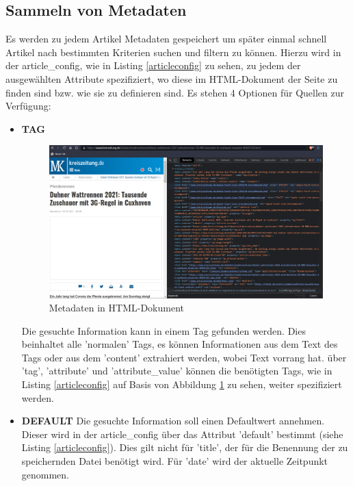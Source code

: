 \documentclass[12pt,oneside,a4paper,parskip]{scrbook}
\begin{document}
\subsection{Sammeln von Metadaten}
Es werden zu jedem Artikel Metadaten gespeichert um später einmal schnell Artikel nach bestimmten Kriterien suchen und filtern zu können. Hierzu wird in der article\_config, wie in Listing \ref{articleconfig} zu sehen, zu jedem der ausgewählten Attribute spezifiziert, wo diese im HTML-Dokument der Seite zu finden sind bzw. wie sie zu definieren sind. Es stehen 4 Optionen für Quellen zur Verfügung: 
\begin{itemize}
\item \textbf{TAG} \newline
\begin{figure}[h!]
\caption{Metadaten in HTML-Dokument}
\label{articlemeta}
\centering
\includegraphics[scale=0.4]{articles_meta.png}
\end{figure} \newline
Die gesuchte Information kann in einem Tag gefunden werden. Dies beinhaltet alle 'normalen' Tags, es können Informationen aus dem Text des Tags oder aus dem 'content' extrahiert werden, wobei Text vorrang hat. über 'tag', 'attribute' und 'attribute\_value' können die benötigten Tags, wie in Listing \ref{articleconfig} auf Basis von Abbildung \ref{articlemeta} zu sehen, weiter spezifiziert werden.


\item \textbf{DEFAULT} \newline
Die gesuchte Information soll einen Defaultwert annehmen. Dieser wird in der article\_config über das Attribut 'default' bestimmt (siehe Listing \ref{articleconfig}). Dies gilt nicht für 'title', der für die Benennung der zu speichernden Datei benötigt wird. Für 'date' wird der aktuelle Zeitpunkt genommen.


\end{itemize}
\end{document}
